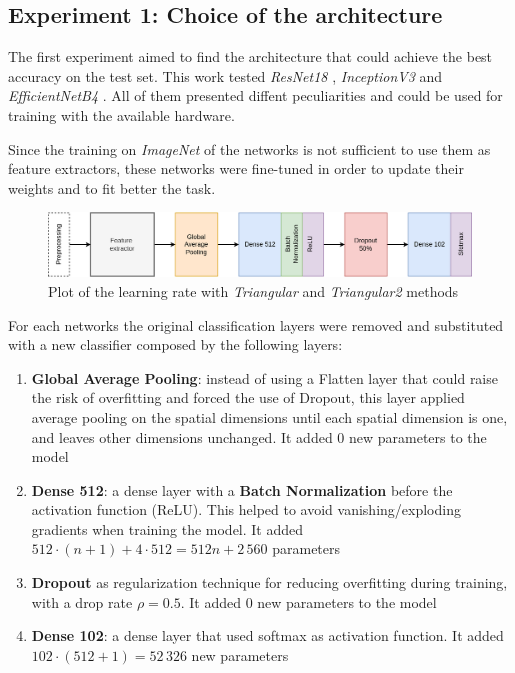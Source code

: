 \subsection{Experiment 1: Choice of the architecture}\label{sec:exp1}
The first experiment aimed to find the architecture that could achieve the best accuracy on the test set. This work tested \textit{ResNet18} \cite{he2015deep}, \textit{InceptionV3} \cite{szegedy2015going} and 
\textit{EfficientNetB4} \cite{tan2019efficientnet}. All of them presented diffent peculiarities and could be used for training with the available hardware. \par
Since the training on \textit{ImageNet} of the networks is not sufficient to use them as feature extractors, these networks were fine-tuned in order to update their weights and to fit better the task.
\begin{figure}[ht!]
\centering
\includegraphics[width=1\textwidth]{images/architecture.png} 
\caption{Plot of the learning rate with \emph{Triangular} and \emph{Triangular2} methods}
\label{fig:architecture}
\end{figure}
For each networks the original classification layers were removed and substituted with a new classifier composed by the following layers:
\begin{enumerate}
\item{\textbf{Global Average Pooling}: instead of using a Flatten layer that could raise the risk of overfitting and forced the use of Dropout, this layer applied average pooling on the spatial dimensions until each spatial dimension is one, and leaves other dimensions unchanged. It added 0 new parameters to the model} 
\item{\textbf{Dense 512}: a dense layer with a \textbf{Batch Normalization} before the activation function (ReLU). This helped to avoid vanishing/exploding gradients when training the model. It added $512 \cdot (n+1) + 4\cdot512 = 512n + 2\,560$ parameters}
\item{\textbf{Dropout} as regularization technique for reducing overfitting during training, with a drop rate $\rho=0.5$. It added 0 new parameters to the model}
\item{\textbf{Dense 102}: a dense layer that used softmax as activation function. It added  $102 \cdot (512+1) = 52\,326$ new parameters}
\end{enumerate}

